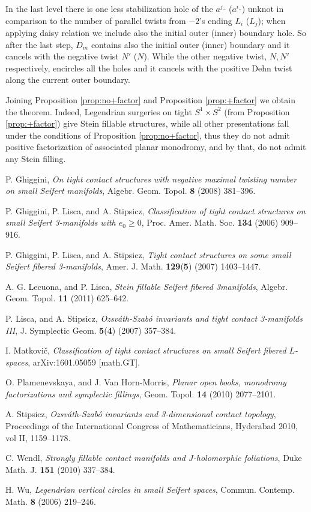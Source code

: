 \documentclass{amsart}
\theoremstyle{definition}
\begin{document}
In the last level there is one less stabilization hole of the $a^j$- ($a^i$-) unknot in comparison to the number of parallel twists from $-2$'s ending $L_i$ ($L_j$); when applying daisy relation we include also the initial outer (inner) boundary hole. So after the last step, $D_m$ contains  also the initial outer (inner) boundary and it cancels with the negative twist $N'$ ($N$). While the other negative twist, $N, N'$ respectively, encircles all the holes and it cancels with the positive Dehn twist along the current outer boundary.
\endproof

Joining Proposition \ref{prop:no+factor} and Proposition \ref{prop:+factor} we obtain the theorem. Indeed, Legendrian surgeries on tight $S^1\times S^2$ (from Proposition \ref{prop:+factor}) give Stein fillable structures, while all other presentations fall under the conditions of Proposition \ref{prop:no+factor}, thus they do not admit positive factorization of associated planar monodromy, and by that, do not admit any Stein filling.
\endproof

\begin{thebibliography}{99}

P. Ghiggini, {\em On tight contact structures with negative maximal twisting number on small Seifert manifolds}, Algebr. Geom. Topol. \textbf{8} (2008) 381--396.

P. Ghiggini, P. Lisca, and A. Stipsicz, {\em Classification of tight contact structures on small Seifert 3-manifolds with $e_0\geq 0$}, Proc. Amer. Math. Soc. \textbf{134} (2006) 909--916.

P. Ghiggini, P. Lisca, and A. Stipsicz, {\em Tight contact structures on some small Seifert fibered 3-manifolds}, Amer. J. Math. \textbf{129}(\textbf{5}) (2007) 1403--1447.

A. G. Lecuona, and P. Lisca, {\em Stein fillable Seifert fibered 3manifolds}, Algebr. Geom. Topol. \textbf{11} (2011) 625--642.

P. Lisca, and A. Stipsicz, {\em Ozsváth-Szabó invariants and tight contact 3-manifolds III}, J. Symplectic Geom. \textbf{5}(\textbf{4}) (2007) 357--384.

I. Matkovi\v{c}, {\em Classification of tight contact structures on small Seifert fibered $L$-spaces}, arXiv:1601.05059 [math.GT].

O. Plamenevskaya, and J. Van Horn-Morris, {\em Planar open books, monodromy factorizations and symplectic fillings}, Geom. Topol. \textbf{14} (2010) 2077--2101.

A. Stipsicz, {\em Ozsváth-Szabó invariants and 3-dimensional contact topology}, Proceedings of the International Congress of Mathematicians, Hyderabad 2010, vol II, 1159--1178.

C. Wendl, {\em Strongly fillable contact manifolds and $J$-holomorphic foliations}, Duke Math. J. \textbf{151} (2010) 337--384.

H. Wu, {\em Legendrian vertical circles in small Seifert spaces}, Commun. Contemp. Math. \textbf{8} (2006) 219--246.

\end{thebibliography}
\end{document}
